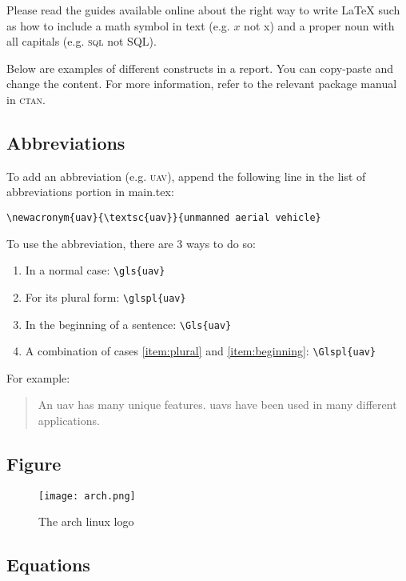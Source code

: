 \documentclass[../main.tex]{subfiles}
\begin{document}
Please read the guides available online about the right way
to write {\LaTeX} such as how to include a math symbol in
text (e.g. $x$ not x) and a proper noun with all capitals
(e.g. \textsc{sql} not SQL).

Below are examples of different constructs in a report. You
can copy-paste and change the content. For more information,
refer to the relevant package manual in \textsc{ctan}.

\subsection{Abbreviations}

To add an abbreviation (e.g. \textsc{uav}), 
append the following line 
in the list of abbreviations portion in main.tex:
\begin{center}
    \verb|\newacronym{uav}{\textsc{uav}}{unmanned aerial vehicle}|
\end{center}

\noindent
To use the abbreviation, there are 3 ways to do so:
\begin{enumerate}
    \item In a normal case: \verb|\gls{uav}|
    \item\label{item:plural} For its plural form: \verb|\glspl{uav}|
    \item\label{item:beginning} In the beginning of a sentence: \verb|\Gls{uav}|
    \item A combination of cases \ref{item:plural} 
        and \ref{item:beginning}: \verb|\Glspl{uav}|
\end{enumerate}

\noindent
For example:
\begin{quotation}
    \noindent
    An \gls{uav} has many unique features. 
    \Glspl{uav} have been used in many different applications.
\end{quotation}

\subsection{Figure}

\begin{figure}[h] 
    \centering
    \texttt{[image: arch.png]} 
    \caption{The arch linux logo} \label{fig:arch-linux} 
\end{figure}

\subsection{Equations}
\end{document}
